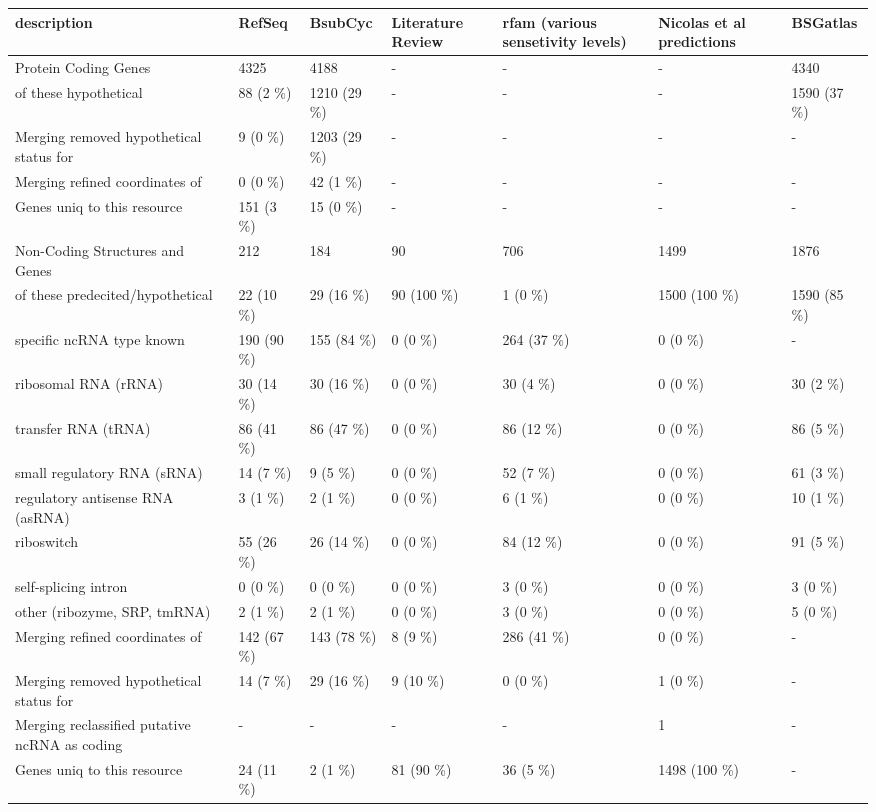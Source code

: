 \centering
\begin{tabular}{lllllll}
\toprule
description & RefSeq & BsubCyc & Literature Review & rfam (various sensetivity levels) & Nicolas et al predictions & BSGatlas\\
\midrule
Protein Coding Genes & 4325 & 4188 & - & - & - & 4340\\
\hspace{1em}of these hypothetical & 88 (2 \%) & 1210 (29 \%) & - & - & - & 1590 (37 \%)\\
Merging removed hypothetical status for & 9 (0 \%) & 1203 (29 \%) & - & - & - & -\\
Merging refined coordinates of & 0 (0 \%) & 42 (1 \%) & - & - & - & -\\
Genes uniq to this resource & 151 (3 \%) & 15 (0 \%) & - & - & - & -\\
\hline
Non-Coding Structures and Genes & 212 & 184 & 90 & 706 & 1499 & 1876\\
\hspace{1em}of these predecited/hypothetical & 22 (10 \%) & 29 (16 \%) & 90 (100 \%) & 1 (0 \%) & 1500 (100 \%) & 1590 (85 \%)\\
specific ncRNA type known & 190 (90 \%) & 155 (84 \%) & 0 (0 \%) & 264 (37 \%) & 0 (0 \%) & -\\
\hspace{1em}ribosomal RNA (rRNA) & 30 (14 \%) & 30 (16 \%) & 0 (0 \%) & 30 (4 \%) & 0 (0 \%) & 30 (2 \%)\\
\hspace{1em}transfer RNA (tRNA) & 86 (41 \%) & 86 (47 \%) & 0 (0 \%) & 86 (12 \%) & 0 (0 \%) & 86 (5 \%)\\
\hspace{1em}small regulatory RNA (sRNA) & 14 (7 \%) & 9 (5 \%) & 0 (0 \%) & 52 (7 \%) & 0 (0 \%) & 61 (3 \%)\\
\hspace{1em}regulatory antisense RNA (asRNA) & 3 (1 \%) & 2 (1 \%) & 0 (0 \%) & 6 (1 \%) & 0 (0 \%) & 10 (1 \%)\\
\hspace{1em}riboswitch & 55 (26 \%) & 26 (14 \%) & 0 (0 \%) & 84 (12 \%) & 0 (0 \%) & 91 (5 \%)\\
\hspace{1em}self-splicing intron & 0 (0 \%) & 0 (0 \%) & 0 (0 \%) & 3 (0 \%) & 0 (0 \%) & 3 (0 \%)\\
\hspace{1em}other (ribozyme, SRP, tmRNA) & 2 (1 \%) & 2 (1 \%) & 0 (0 \%) & 3 (0 \%) & 0 (0 \%) & 5 (0 \%)\\
Merging refined coordinates of & 142 (67 \%) & 143 (78 \%) & 8 (9 \%) & 286 (41 \%) & 0 (0 \%) & -\\
Merging removed hypothetical status for & 14 (7 \%) & 29 (16 \%) & 9 (10 \%) & 0 (0 \%) & 1 (0 \%) & -\\
Merging reclassified putative ncRNA as coding & - & - & - & - & 1 & -\\
Genes uniq to this resource & 24 (11 \%) & 2 (1 \%) & 81 (90 \%) & 36 (5 \%) & 1498 (100 \%) & -\\
\bottomrule
\end{tabular}
